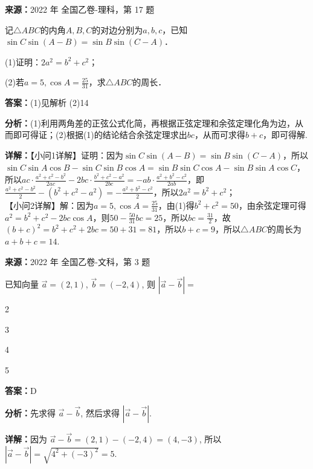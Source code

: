 \begin{question}[points=12]
\textbf{来源：}2022 年 全国乙卷-理科，第 17 题\par
记$\triangle ABC$的内角$A,B,C$的对边分别为$a,b,c$，已知$\sin C\sin(A-B) = \sin B\sin(C-A)$．

(1)证明：$2a^2 = b^2 + c^2$；

(2)若$a=5,\cos A = \frac{25}{31}$，求$\triangle ABC$的周长．
\begin{solution}
\textbf{答案：}(1)见解析 (2)14

\textbf{分析：}(1)利用两角差的正弦公式化简，再根据正弦定理和余弦定理化角为边，从而即可得证；(2)根据(1)的结论结合余弦定理求出$bc$，从而可求得$b+c$，即可得解.

\textbf{详解：}【小问1详解】证明：因为$\sin C\sin(A-B)=\sin B\sin(C-A)$，所以$\sin C\sin A\cos B - \sin C\sin B\cos A = \sin B\sin C\cos A - \sin B\sin A\cos C$，所以$ac\cdot\frac{a^2+c^2-b^2}{2ac} - 2bc\cdot\frac{b^2+c^2-a^2}{2bc} = -ab\cdot\frac{a^2+b^2-c^2}{2ab}$，即$\frac{a^2+c^2-b^2}{2} - (b^2+c^2-a^2) = -\frac{a^2+b^2-c^2}{2}$，所以$2a^2 = b^2 + c^2$；\\【小问2详解】解：因为$a=5,\cos A=\frac{25}{31}$，由(1)得$b^2+c^2=50$，由余弦定理可得$a^2 = b^2+c^2 - 2bc\cos A$，则$50 - \frac{50}{31}bc = 25$，所以$bc = \frac{31}{2}$，故$(b+c)^2 = b^2+c^2+2bc = 50+31=81$，所以$b+c=9$，所以$\triangle ABC$的周长为$a+b+c=14$.
\end{solution}
\end{question}

\begin{question}[points=5]
\textbf{来源：}2022 年 全国乙卷-文科，第 3 题\par
已知向量 $\vec{a}=(2,1)$, $\vec{b}=(-2,4)$, 则 $|\vec{a} - \vec{b}| =$
\begin{choices}
  \item 2
  \item 3
  \item 4
  \item 5
\end{choices}
\begin{solution}
\textbf{答案：}D

\textbf{分析：}先求得 $\vec{a} - \vec{b}$, 然后求得 $|\vec{a} - \vec{b}|$.

\textbf{详解：}因为 $\vec{a} - \vec{b} = (2,1) - (-2,4) = (4,-3)$, 所以 $|\vec{a} - \vec{b}| = \sqrt{4^2 + (-3)^2} = 5$.
\end{solution}
\end{question}

